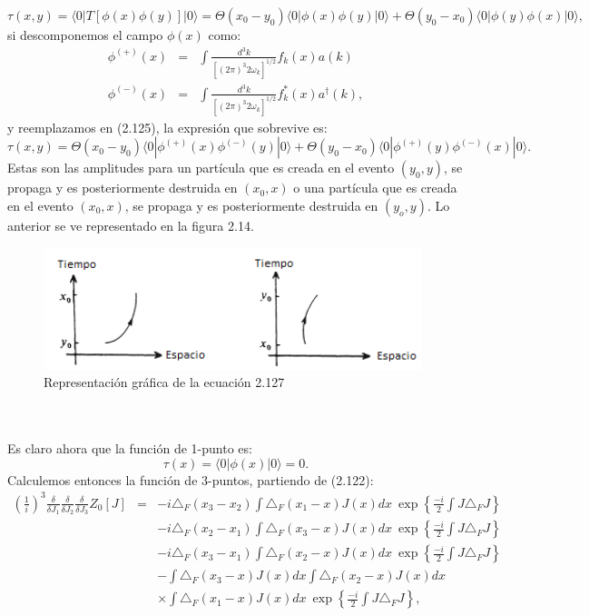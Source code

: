 \begin{equation}
\tau(x,y)=\langle0|T[\phi(x)\phi(y)]|0\rangle=\Theta(x_{0}-y_{0})\langle0|\phi(x)\phi(y)|0\rangle+\Theta(y_{0}-x_{0})\langle0|\phi(y)\phi(x)|0\rangle ,
\end{equation}          
si descomponemos el campo $\phi(x)$ como:
\begin{eqnarray}
\phi^{(+)}(x)&=&\int\frac{d^{3}k}{[(2\pi)^{3}2\omega_{k}]^{1/2}}f_{k}(x)a(k)\\
\phi^{(-)}(x)&=&\int\frac{d^{3}k}{[(2\pi)^{3}2\omega_{k}]^{1/2}}f_{k}^*(x)a^\dagger(k),
\end{eqnarray}
y reemplazamos en (2.125), la expresión que sobrevive es:
\begin{equation}
\tau(x,y)=\Theta(x_{0}-y_{0})\langle0|\phi^{(+)}(x)\phi^{(-)}(y)|0\rangle+\Theta(y_{0}-x_{0})\langle0|\phi^{(+)}(y)\phi^{(-)}(x)|0\rangle .
\end{equation}
Estas son las amplitudes para un partícula que es creada en el evento $(y_0,y)$, se propaga y es posteriormente destruida en $(x_0,x)$ o una partícula que es creada en el evento $(x_0,x)$, se propaga y es posteriormente destruida en $(y_o,y)$. Lo anterior se ve representado en la figura 2.14.
\begin{figure}[h!]
\centering
\includegraphics[width=11cm]{Imagenes/Fig15}
\caption[Representación gráfica de la función de 2-puntos ]{Representación gráfica de la ecuación 2.127}
\end{figure}
\\
\\
Es claro ahora que la función de 1-punto es:
\begin{equation}
\tau(x)=\langle 0|\phi(x)|0\rangle=0 .
\end{equation}
Calculemos entonces la función de 3-puntos, partiendo de (2.122):
\begin{eqnarray}
\nonumber\left(\frac{1}{i}\right)^{3}\frac{\delta}{\delta J_{1}}\frac{\delta}{\delta J_{2}}\frac{\delta}{\delta J_{3}}Z_{0}[J]&=&-i\triangle_{F}(x_{3}-x_{2})\int\triangle_{F}(x_{1}-x)J(x)dx\ \exp\left\{ \frac{-i}{2}\int J\triangle_{F}J\right\}\\
\nonumber && -i\triangle_{F}(x_{2}-x_{1})\int\triangle_{F}(x_{3}-x)J(x)dx\ \exp\left\{ \frac{-i}{2}\int J\triangle_{F}J\right\}\\
\nonumber &&-i\triangle_{F}(x_{3}-x_{1})\int\triangle_{F}(x_{2}-x)J(x)dx\ \exp\left\{ \frac{-i}{2}\int J\triangle_{F}J\right\}\\
\nonumber &&-\int\triangle_{F}(x_{3}-x)J(x)dx\int\triangle_{F}(x_{2}-x)J(x)dx\\
&&\times\int\triangle_{F}(x_{1}-x)J(x)dx\ \exp\left\{ \frac{-i}{2}\int J\triangle_{F}J\right\} ,
\end{eqnarray}
